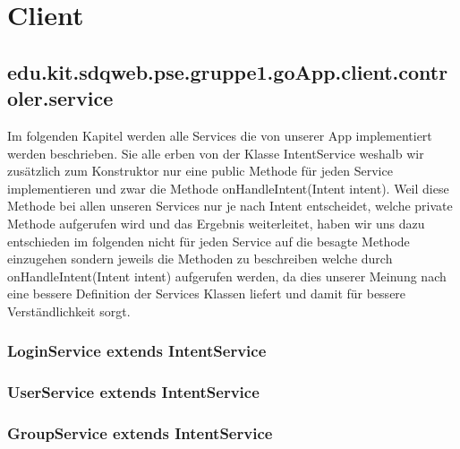 
\section{Client} 
	\subsection{edu.kit.sdqweb.pse.gruppe1.goApp.client.controler.service}
	Im folgenden Kapitel werden alle Services die von unserer App implementiert werden beschrieben.
	Sie alle erben von der Klasse IntentService weshalb wir zusätzlich zum Konstruktor nur eine public Methode für jeden Service implementieren und zwar die Methode onHandleIntent(Intent intent).
	Weil diese Methode bei allen unseren Services nur je nach Intent entscheidet, welche private Methode aufgerufen wird und das Ergebnis weiterleitet, haben wir uns dazu entschieden im folgenden nicht für jeden Service auf die besagte Methode einzugehen sondern jeweils die Methoden zu beschreiben welche durch onHandleIntent(Intent intent) aufgerufen werden, da dies unserer Meinung nach eine bessere Definition der Services Klassen liefert und damit für bessere Verständlichkeit sorgt. 
	\subsubsection {LoginService extends IntentService}
	\subsubsection {UserService extends IntentService}
	\subsubsection {GroupService extends IntentService}
